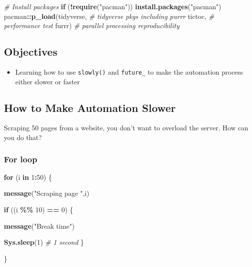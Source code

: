 \documentclass[
]{book}
\newenvironment{Shaded}{\begin{snugshade}}{\end{snugshade}}
\newcommand{\CommentTok}[1]{\textcolor[rgb]{0.56,0.35,0.01}{\textit{#1}}}
\newcommand{\ControlFlowTok}[1]{\textcolor[rgb]{0.13,0.29,0.53}{\textbf{#1}}}
\newcommand{\DecValTok}[1]{\textcolor[rgb]{0.00,0.00,0.81}{#1}}
\newcommand{\KeywordTok}[1]{\textcolor[rgb]{0.13,0.29,0.53}{\textbf{#1}}}
\newcommand{\NormalTok}[1]{#1}
\newcommand{\OperatorTok}[1]{\textcolor[rgb]{0.81,0.36,0.00}{\textbf{#1}}}
\newcommand{\StringTok}[1]{\textcolor[rgb]{0.31,0.60,0.02}{#1}}
\providecommand{\tightlist}{%
  \setlength{\itemsep}{0pt}\setlength{\parskip}{0pt}}
\begin{document}
\begin{Shaded}
\begin{Highlighting}[]
\CommentTok{\# Install packages }
\ControlFlowTok{if}\NormalTok{ (}\OperatorTok{!}\KeywordTok{require}\NormalTok{(}\StringTok{"pacman"}\NormalTok{)) }\KeywordTok{install.packages}\NormalTok{(}\StringTok{"pacman"}\NormalTok{)}
\NormalTok{pacman}\OperatorTok{::}\KeywordTok{p\_load}\NormalTok{(tidyverse, }\CommentTok{\# tidyverse pkgs including purrr}
\NormalTok{               tictoc, }\CommentTok{\# performance test }
\NormalTok{               furrr) }\CommentTok{\# parallel processing  reproducibility }
\end{Highlighting}
\end{Shaded}

\hypertarget{objectives-3}{%
\subsection{Objectives}\label{objectives-3}}

\begin{itemize}
\tightlist
\item
  Learning how to use \texttt{slowly()} and \texttt{future\_} to make the automation process either slower or faster
\end{itemize}

\hypertarget{how-to-make-automation-slower}{%
\subsection{How to Make Automation Slower}\label{how-to-make-automation-slower}}

Scraping 50 pages from a website, you don't want to overload the server. How can you do that?

\hypertarget{for-loop-2}{%
\subsubsection{For loop}\label{for-loop-2}}

\begin{Shaded}
\begin{Highlighting}[]
\ControlFlowTok{for}\NormalTok{ (i }\ControlFlowTok{in} \DecValTok{1}\OperatorTok{:}\DecValTok{50}\NormalTok{) \{}
  
  \KeywordTok{message}\NormalTok{(}\StringTok{"Scraping page "}\NormalTok{,i)}
  
  \ControlFlowTok{if}\NormalTok{ ((i }\OperatorTok{\%\%}\StringTok{ }\DecValTok{10}\NormalTok{) }\OperatorTok{==}\StringTok{ }\DecValTok{0}\NormalTok{) \{}
    
    \KeywordTok{message}\NormalTok{(}\StringTok{"Break time"}\NormalTok{)}
    
    \KeywordTok{Sys.sleep}\NormalTok{(}\DecValTok{1}\NormalTok{) }\CommentTok{\# 1 second }
\NormalTok{  \}}
  
\NormalTok{\}}
\end{Highlighting}
\end{Shaded}
\end{document}
